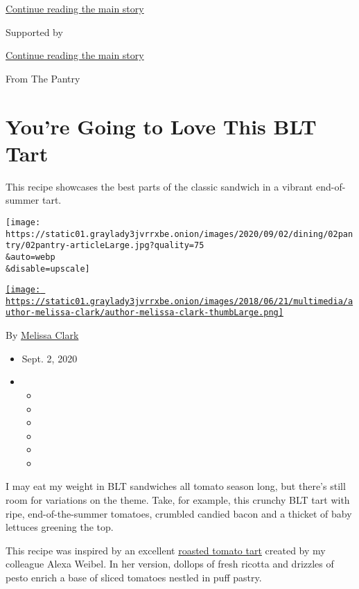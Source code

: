 \protect\hyperlink{after-top}{Continue reading the main story}

Supported by

\protect\hyperlink{after-sponsor}{Continue reading the main story}

From The Pantry

\hypertarget{youre-going-to-love-this-blt-tart}{%
\section{You're Going to Love This BLT
Tart}\label{youre-going-to-love-this-blt-tart}}

This recipe showcases the best parts of the classic sandwich in a
vibrant end-of-summer tart.

\texttt{[image: https://static01.graylady3jvrrxbe.onion/images/2020/09/02/dining/02pantry/02pantry-articleLarge.jpg?quality=75\\\&auto=webp\\\&disable=upscale]}

\href{https://www.nytimes3xbfgragh.onion/by/melissa-clark}{\texttt{[image: https://static01.graylady3jvrrxbe.onion/images/2018/06/21/multimedia/author-melissa-clark/author-melissa-clark-thumbLarge.png]}}

By \href{https://www.nytimes3xbfgragh.onion/by/melissa-clark}{Melissa
Clark}

\begin{itemize}
\item
  Sept. 2, 2020
\item
  \begin{itemize}
  \item
  \item
  \item
  \item
  \item
  \item
  \end{itemize}
\end{itemize}

I may eat my weight in BLT sandwiches all tomato season long, but
there's still room for variations on the theme. Take, for example, this
crunchy BLT tart with ripe, end-of-the-summer tomatoes, crumbled candied
bacon and a thicket of baby lettuces greening the top.

This recipe was inspired by an excellent
\href{https://cooking.nytimes3xbfgragh.onion/recipes/1020373-roasted-tomato-tart-with-ricotta-and-pesto}{roasted
tomato tart} created by my colleague Alexa Weibel. In her version,
dollops of fresh ricotta and drizzles of pesto enrich a base of sliced
tomatoes nestled in puff pastry.

